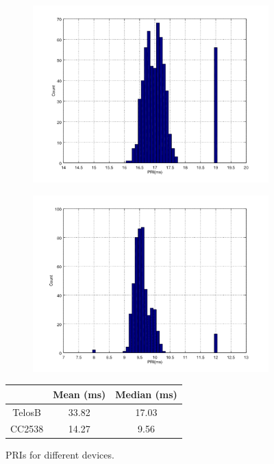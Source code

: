 \begin{figure}[ht!]
	\centering
	\begin{subfigure}{0.45\linewidth}
		\includegraphics[width=\linewidth]{fig/helloworld_sky.png}
	\end{subfigure}
	\begin{subfigure}{0.45\linewidth}
		\includegraphics[width=\linewidth]{fig/helloworld_cc2538.png}
	\end{subfigure}
	
	{
		\begin{tabular}{|c|c|c|}
			\hline
			              & Mean (ms)     & Median (ms)   \\ \hline
			TelosB  & 33.82 & 17.03 \\ \hline
			CC2538 & 14.27         & 9.56          \\ \hline
		\end{tabular}
	}
	\caption{PRIs for different devices. \label{PRIs}}
\end{figure}

